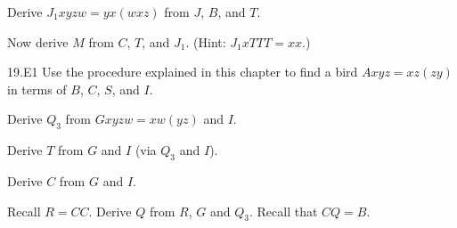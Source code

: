 \documentclass[12pt, letterpaper]{article}
\begin{document}
\begin{prob}{19.6}  
Derive $J_1xyzw = yx(wxz)$ from $J$, $B$, and $T$.
\end{prob}

\begin{prob}{19.7}  
Now derive $M$ from $C$, $T$, and $J_1$. (Hint: $J_1xTTT = xx$.)
\end{prob}

\begin{prob}{19.E1} 
Use the procedure explained in this chapter to find a bird $Axyz = xz(zy)$ in terms of $B$, $C$, $S$, and $I$.
\end{prob}

\begin{prob}{20.1}  
Derive $Q_3$ from $Gxyzw = xw(yz)$ and $I$.
\end{prob}

\begin{prob}{20.2}  
Derive $T$ from $G$ and $I$ (via $Q_3$ and $I$).
\end{prob}

\begin{prob}{20.3}  
Derive $C$ from $G$ and $I$.
\end{prob}

\begin{prob}{20.4}  
Recall $R = CC$. Derive $Q$ from $R$, $G$ and $Q_3$. Recall that $CQ = B$.
\end{prob}
\end{document}
